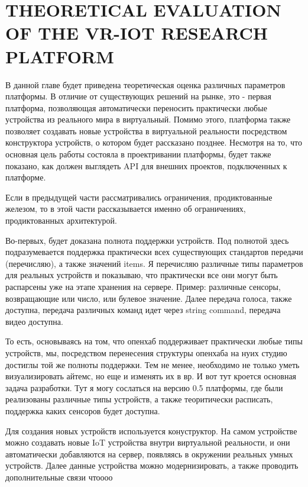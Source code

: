 
\chapter{THEORETICAL EVALUATION OF THE VR-IOT RESEARCH PLATFORM}
В данной главе будет приведена теоретическая оценка различных параметров платформы. В отличие от существующих решений на рынке, это - первая платформа, позволяющая автоматически переносить практически любые устройства из реального мира в виртуальный. Помимо этого, платформа также позволяет создавать новые устройства в виртуальной реальности посредством конструктора устройств, о котором будет рассказано позднее. Несмотря на то, что основная цель работы состояла в проектривании платформы, будет также показано, как должен выглядеть API для внешних проектов, подключенных к платформе.

Если в предыдущей части рассматривались ограничения, продиктованные железом, то в этой части рассказывается именно об ограничениях, продиктованных архитектурой.

Во-первых, будет доказана полнота поддержки устройств. Под полнотой здесь подразумевается поддержка практически всех существующих стандартов передачи (перечисляю), а также значений items. Я перечисляю различные типы параметров для реальных устройств и показываю, что практически все они могут быть распарсены уже на этапе хранения на сервере. Пример: различные сенсоры, возвращающие или число, или булевое значение. Далее передача голоса, также доступна, передача различных команд идет через string command, передача видео доступна.

То есть, основываясь на том, что опенхаб поддерживает практически любые типы устройств, мы, посредством перенесения структуры опенхаба на нуих студию достиглы той же полноты поддержки. Тем не менее, необходимо не только уметь визуализировать айтемс, но еще и изменять их в вр. И вот тут кроется основная задача разработки. Тут я могу сослаться на версию 0.5 платформы, где были реализованы различные типы устройств, а также теоритически расписать, поддержка каких сенсоров будет доступна.

Для создания новых устройств используется конуструктор. На самом устройстве можно создавать новые IoT устройства внутри виртуальной реальности, и они автоматически добавляются на сервер, появляясь в окружении реальных умных устройств. Далее данные устройства можно модернизировать, а также проводить дополнительные связи чтоооо

